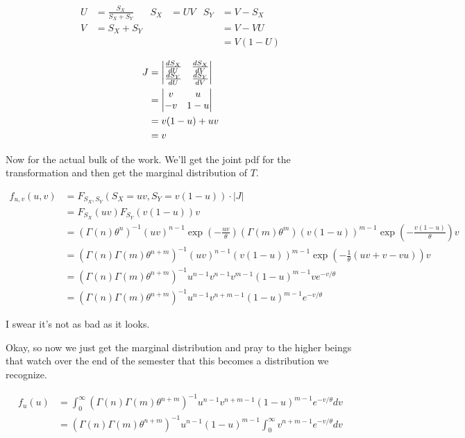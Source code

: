 \begin{align*}
	U &= \frac{S_X}{S_X + S_Y} & S_X &= UV & S_Y &= V - S_X \\
	V &= S_X + S_Y &&& &= V - VU \\
	&&&&&= V(1-U)
\end{align*}

\begin{align*}
	J &= \m{v}{\frac{dS_X}{dU} & \frac{dS_X}{dV} \\ \frac{dS_Y}{dU} & \frac{dS_Y}{dV} } \\
	&= \m{v}{v & u \\ -v & 1-u} \\
	&= v(1-u) + uv \\
	&= v
\end{align*}

Now for the actual bulk of the work. We'll get the joint pdf for the transformation and then get the marginal distribution of $T$. 

\begin{align*}
	f_{u,v}(u,v) &= F_{S_X, S_Y}(S_X = uv, S_Y = v(1-u)) \cdot |J| \\
	&= F_{S_X}(uv)F_{S_Y}(v(1-u)) v \\
	&= (\Gamma(n)\theta^n)^{-1} (uv)^{n-1} \exp\left( -\frac{uv}{\theta} \right) (\Gamma(m)\theta^m) (v(1-u))^{m-1} \exp\left( -\frac{v(1-u)}{\theta} \right) v \\ 
	&= (\Gamma(n)\Gamma(m)\theta^{n+m})^{-1} (uv)^{n-1} (v(1-u))^{m-1} \exp\left( -\frac{1}{\theta}(uv + v - vu) \right) v \\
	&= (\Gamma(n)\Gamma(m)\theta^{n+m})^{-1} u^{n-1} v^{n-1} v^{m-1} (1-u)^{m-1} v e^{-v/\theta} \\
	&= (\Gamma(n)\Gamma(m)\theta^{n+m})^{-1} u^{n-1} v^{n+m-1} (1-u)^{m-1} e^{-v/\theta}
\end{align*}

I swear it's not as bad as it looks. 

Okay, so now we just get the marginal distribution and pray to the higher beings that watch over the end of the semester that this becomes a distribution we recognize.

\begin{align*}
	f_u(u) &= \int_{0}^{\infty} (\Gamma(n)\Gamma(m)\theta^{n+m})^{-1} u^{n-1} v^{n+m-1} (1-u)^{m-1} e^{-v/\theta} dv \\
	&= (\Gamma(n)\Gamma(m)\theta^{n+m})^{-1} u^{n-1}  (1-u)^{m-1} \int_{0}^{\infty} v^{n+m-1} e^{-v/\theta} dv \\
\end{align*}


